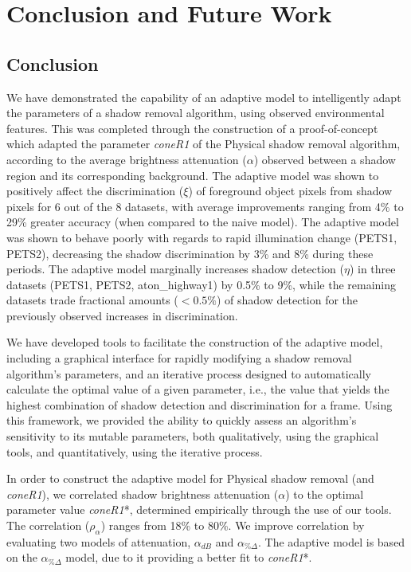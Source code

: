 \clearpage
\chapter{Conclusion and Future Work}

\section{Conclusion}

We have demonstrated the capability of an adaptive model to intelligently adapt the parameters of a shadow removal algorithm, using observed environmental features. This was completed through the construction of a proof-of-concept which adapted the parameter \textit{coneR1} of the Physical shadow removal algorithm, according to the average brightness attenuation ($\alpha$) observed between a shadow region and its corresponding background. The adaptive model was shown to positively affect the discrimination ($\xi$) of foreground object pixels from shadow pixels for 6 out of the 8 datasets, with average improvements ranging from 4\% to 29\% greater accuracy (when compared to the naive model). The adaptive model was shown to behave poorly with regards to rapid illumination change (PETS1, PETS2), decreasing the shadow discrimination by 3\% and 8\% during these periods. The adaptive model marginally increases shadow detection ($\eta$) in three datasets (PETS1, PETS2, aton\_highway1) by 0.5\% to 9\%, while the remaining datasets trade fractional amounts ($< 0.5\%$) of shadow detection for the previously observed increases in discrimination.

We have developed tools to facilitate the construction of the adaptive model, including a graphical interface for rapidly modifying a shadow removal algorithm's parameters, and an iterative process designed to automatically calculate the optimal value of a given parameter, i.e., the value that yields the highest combination of shadow detection and discrimination for a frame. Using this framework, we provided the ability to quickly assess an algorithm's sensitivity to its mutable parameters, both qualitatively, using the graphical tools, and quantitatively, using the iterative process.

In order to construct the adaptive model for Physical shadow removal (and \textit{coneR1}), we correlated shadow brightness attenuation ($\alpha$) to the optimal parameter value \textit{coneR1}*, determined empirically through the use of our tools. The correlation ($\rho_{\alpha}$) ranges from 18\% to 80\%. We improve correlation by evaluating two models of attenuation, $\alpha_{dB}$ and $\alpha_{\%\Delta}$. The adaptive model is based on the $\alpha_{\%\Delta}$ model, due to it providing a better fit to \textit{coneR1}*. 

